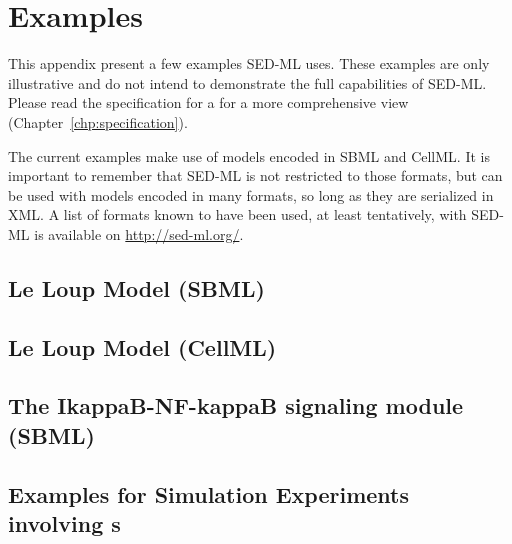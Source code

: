 \chapter{Examples}

This appendix present a few examples SED-ML uses. These examples are only illustrative and do not intend to demonstrate the full capabilities of SED-ML. Please read the specification for  a for a more comprehensive view (Chapter~\ref{chp:specification}). 

The current examples make use of models encoded in SBML and CellML. It is important to remember that SED-ML is not restricted to those formats, but can be used with models encoded in many formats, so long as they are serialized in XML. A list of formats known to have been used, at least tentatively, with SED-ML is available on \url{http://sed-ml.org/}.

\section{Le Loup Model (SBML)}


\section{Le Loup Model (CellML)}


\newpage
\section{The IkappaB-NF-kappaB signaling module (SBML)}


\section{Examples for Simulation Experiments involving s}



